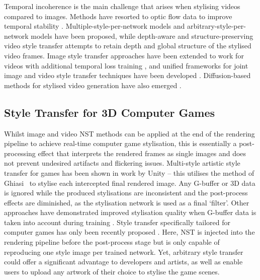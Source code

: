 Temporal incoherence is the main challenge that arises when stylising videos compared to images. Methods have resorted to optic flow data to improve temporal stability \cite{ruder2016artistic,gao2018reconet}. Multiple-style-per-network models \cite{gao2020fast} and arbitrary-style-per-network models \cite{deng2021arbitrary,lu2022universal} have been proposed, while depth-aware and structure-preserving video style transfer \cite{cheng2019structure,liu2021structure,ioannou2023depth} attempts to retain depth and global structure of the stylised video frames. Image style transfer approaches have been extended to work for videos with additional temporal loss training \cite{li2019learning,liu2021adaattn}, and unified frameworks for joint image and video style transfer techniques have been developed \cite{gu2023two,zhang2023unified}. Diffusion-based methods for stylised video generation have also emerged \cite{ku2024anyv2v}.


\subsection{Style Transfer for 3D Computer Games}

Whilst image and video NST methods can be applied at the end of the rendering pipeline to achieve real-time computer game stylisation, this is essentially a post-processing effect that interprets the rendered frames as single images and does not prevent undesired artifacts and flickering issues. Multi-style artistic style transfer for games has been shown in work by Unity \cite{deliot_guinier_vanhoey_2020} -- this utilises the method of Ghiasi~\etal {} to stylise each intercepted final rendered image. Any G-buffer or 3D data is ignored while the produced stylisations are inconsistent and the post-process effects are diminished, as the stylisation network is used as a final `filter'. Other approaches have demonstrated improved stylisation quality when G-buffer data is taken into account during training \cite{richter2022enhancing,Mittermueller2022estgan}. Style transfer specifically tailored for computer games has only been recently proposed \cite{ioannou2023games,ioannou2024towards}. Here, NST is injected into the rendering pipeline before the post-process stage but is only capable of reproducing one style image per trained network. Yet, arbitrary style transfer could offer a significant advantage to developers and artists, as well as enable users to upload any artwork of their choice to stylise the game scenes.


